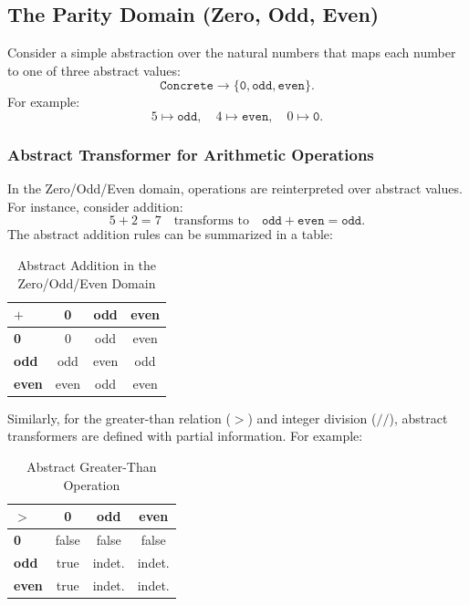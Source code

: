 \documentclass[oneside,11pt,dvipsnames]{book}
\begin{document}
\subsection{The Parity Domain (Zero, Odd, Even)}\label{sec:zero-odd-even}

Consider a simple abstraction over the natural numbers that maps each number to one of three abstract values:
\[
\texttt{Concrete} \to \{\texttt{0}, \texttt{odd}, \texttt{even}\}.
\]
For example:
\[
5 \mapsto \texttt{odd}, \quad 4 \mapsto \texttt{even}, \quad 0 \mapsto \texttt{0}.
\]

\subsubsection{Abstract Transformer for Arithmetic Operations}

In the Zero/Odd/Even domain, operations are reinterpreted over abstract values. For instance, consider addition:
\[
5 + 2 = 7 \quad \text{transforms to} \quad \texttt{odd} + \texttt{even} = \texttt{odd}.
\]
The abstract addition rules can be summarized in a table:

\begin{table}[h]
\centering
\begin{tabular}{|l|c|c|c|}
\hline
$+$        & 0    & odd   & even   \\ \hline
\textbf{0} & 0    & odd   & even   \\ \hline
\textbf{odd}   & odd  & even  & odd    \\ \hline
\textbf{even}  & even & odd   & even   \\ \hline
\end{tabular}
\caption{Abstract Addition in the Zero/Odd/Even Domain}
\end{table}

Similarly, for the greater-than relation (\(>\)) and integer division (\(//\)), abstract transformers are defined with partial information. For example:

\begin{table}[h]
\centering
\begin{tabular}{|l|c|c|c|}
\hline
$>$      & 0   & odd   & even   \\ \hline
\textbf{0}    & false   & false     & false      \\ \hline
\textbf{odd}  & true    & indet.    & indet.     \\ \hline
\textbf{even} & true    & indet.    & indet.     \\ \hline
\end{tabular}
\caption{Abstract Greater-Than Operation}
\end{table}
\end{document}
